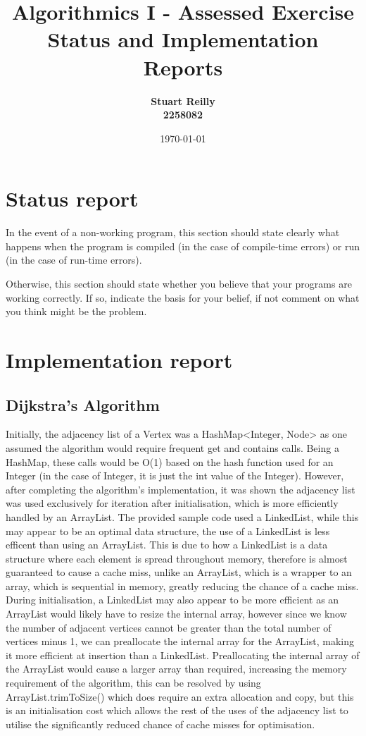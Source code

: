 \documentclass{article}
\title{Algorithmics I - Assessed Exercise\\ \vspace{4mm}
Status and Implementation Reports}
\author{\textbf{Stuart Reilly} \\ \textbf{2258082} }
\date{\today}
\begin{document}
    \maketitle

    \section*{Status report}

    In the event of a non-working program, this section should state clearly what happens when the program is compiled (in the case of compile-time errors) or run (in the case of run-time errors).

    Otherwise, this section should state whether you believe that your programs are working correctly. If so, indicate the basis for your belief, if not comment on what you think might be the problem.

    \section*{Implementation report}

    \subsection*{Dijkstra's Algorithm}

    Initially, the adjacency list of a Vertex was a HashMap<Integer, Node> as one assumed the algorithm would require
    frequent get and contains calls.
    Being a HashMap, these calls would be O(1) based on the hash function used for an Integer (in the case of Integer, it is
    just the int value of the Integer).
    However, after completing the algorithm's implementation, it was shown the adjacency list was used exclusively for
    iteration after initialisation, which is more efficiently handled by an ArrayList.
    The provided sample code used a LinkedList, while this may appear to be an optimal data structure, the use of a 
    LinkedList is less efficent than using an ArrayList.
    This is due to how a LinkedList is a data structure where each element is spread throughout memory, therefore is 
    almost guaranteed to cause a cache miss, unlike an ArrayList, which is a wrapper to an array, which is sequential in
    memory, greatly reducing the chance of a cache miss.
    During initialisation, a LinkedList may also appear to be more efficient as an ArrayList would likely have to resize the 
    internal array, however since we know the number of adjacent vertices cannot be greater than the total number of vertices
    minus 1, we can preallocate the internal array for the ArrayList, making it more efficient at insertion than a LinkedList.
    Preallocating the internal array of the ArrayList would cause a larger array than required, increasing the memory requirement
    of the algorithm, this can be resolved by using ArrayList.trimToSize() which does require an extra allocation and copy, 
    but this is an initialisation cost which allows the rest of the uses of the adjacency list to utilise the significantly
    reduced chance of cache misses for optimisation.
\end{document}
